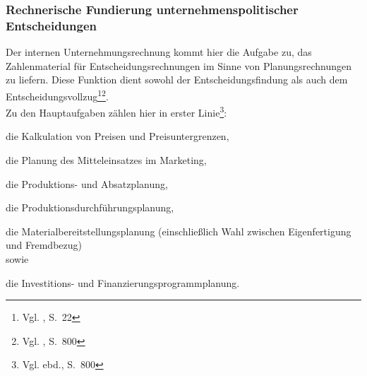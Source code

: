 \subsubsection{Rechnerische Fundierung unternehmenspolitischer Entscheidungen}
Der internen Unternehmungsrechnung kommt hier die Aufgabe zu, das Zahlenmaterial für Entscheidungsrechnungen im Sinne von Planungsrechnungen zu liefern. Diese Funktion dient sowohl der Entscheidungsfindung als auch dem Entscheidungsvollzug\footnote{Vgl. \cite{Klein1999}, S.~22}\footnote{Vgl. \cite{Schierenbeck2008}, S.~800}.\\
Zu den Hauptaufgaben zählen hier in erster Linie\footnote{Vgl. ebd., S.~800}: 
\begin{compactitem}
\item die Kalkulation von Preisen und Preisuntergrenzen, 
\item die Planung des Mitteleinsatzes im Marketing, 
\item die Produktions- und Absatzplanung, 
\item die Produktionsdurchführungsplanung, 
\item die Materialbereitstellungsplanung (einschließlich Wahl zwischen Eigenfertigung und Fremdbezug) \\sowie 
\item die Investitions- und Finanzierungsprogrammplanung. 
\end{compactitem} 



